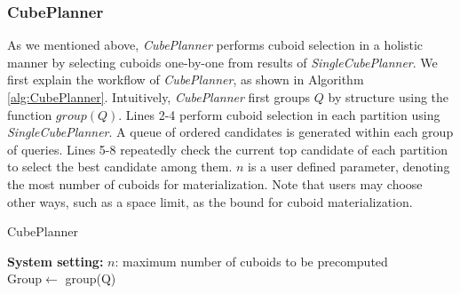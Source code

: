 	\subsubsection{CubePlanner}
	\label{CubePlanner}
	
	As we mentioned above, \emph{CubePlanner} performs cuboid selection in a holistic manner by  selecting cuboids one-by-one from results of \emph{SingleCubePlanner}. We first explain the workflow of \emph{CubePlanner}, as shown in Algorithm \ref{alg:CubePlanner}. %
	Intuitively, \emph{CubePlanner} first groups $Q$ by structure using the function $group(Q)$. Lines 2-4 perform cuboid selection in each partition using \emph{SingleCubePlanner}. A queue of ordered candidates is generated within each group of queries. Lines 5-8 repeatedly check the current top candidate of each partition to select the best candidate among them. $n$ is a user defined parameter, denoting the most number of cuboids for materialization.  Note that users may choose other ways, such as a space limit, as the bound for cuboid materialization.
	
	\begin{algorithm}%
		\label{alg:CubePlanner}
		\caption{CubePlanner}
		\LinesNumbered
		\textbf{System setting:}
		$n$: maximum number of cuboids to be precomputed\\
		Group$\leftarrow$ group(Q)\;
		
		
	\end{algorithm}
	
	
	
